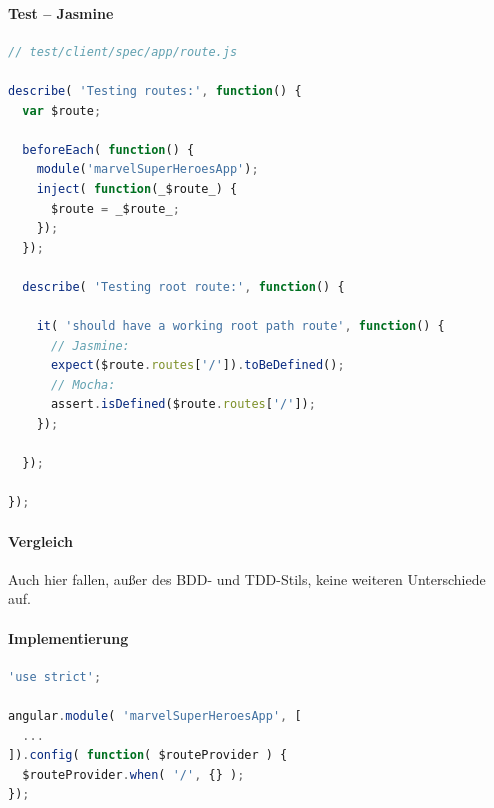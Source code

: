 \paragraph{Test -- Jasmine}
\begin{lstlisting}[language=JavaScript, caption=TDD AngularJS - Routes]
// test/client/spec/app/route.js

describe( 'Testing routes:', function() {
  var $route;

  beforeEach( function() {
    module('marvelSuperHeroesApp');
    inject( function(_$route_) {
      $route = _$route_;
    });
  });

  describe( 'Testing root route:', function() {

    it( 'should have a working root path route', function() {
      // Jasmine:
      expect($route.routes['/']).toBeDefined();
      // Mocha:
      assert.isDefined($route.routes['/']);
    });

  });

});
\end{lstlisting}

\paragraph{Vergleich}
Auch hier fallen, außer des BDD- und TDD-Stils, keine weiteren Unterschiede auf.

\paragraph{Implementierung}
\begin{lstlisting}[language=JavaScript, caption=TDD AngularJS - Routes - Implementierung]
'use strict';

angular.module( 'marvelSuperHeroesApp', [
  ...
]).config( function( $routeProvider ) {
  $routeProvider.when( '/', {} );
});

\end{lstlisting}

\newpage
